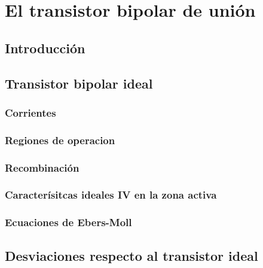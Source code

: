 
\chapter{El transistor bipolar de unión}


\section{Introducción}


\section{Transistor bipolar ideal}

\subsection{Corrientes}

\subsection{Regiones de operacion}

\subsection{Recombinación}

\subsection{Caracterísitcas ideales IV en la zona activa}

\subsection{Ecuaciones de Ebers-Moll}


\section{Desviaciones respecto al transistor ideal}
